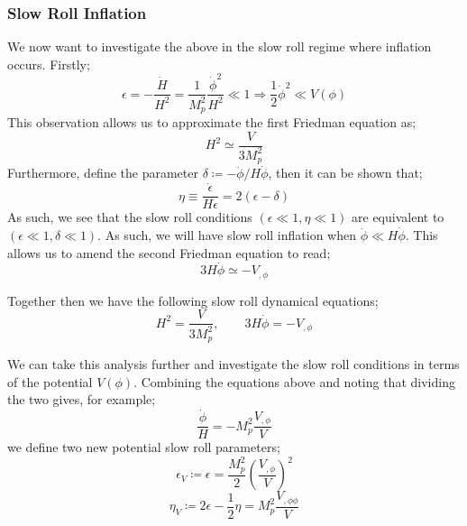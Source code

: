\subsubsection{Slow Roll Inflation}
We now want to investigate the above in the slow roll regime where inflation occurs. Firstly;
\begin{equation*}
\epsilon = -\frac{\dot{H}}{H^2} = \frac{1}{M_p^2}\frac{\dot{\phi}^2}{H^2} \ll 1 \Rightarrow \frac{1}{2}\dot{\phi}^2 \ll V(\phi)
\end{equation*}
This observation allows us to approximate the first Friedman equation as;
\begin{equation*}
H^2 \simeq \frac{V}{3M_p^2}
\end{equation*}
Furthermore, define the parameter $\delta \coloneqq -\ddot{\phi}/H\dot{\phi}$, then it can be shown that;
\begin{equation}
\eta \equiv \frac{\dot{\epsilon}}{H\epsilon} = 2(\epsilon - \delta)
\end{equation}
As such, we see that the slow roll conditions $(\epsilon \ll 1, \eta \ll 1)$ are equivalent to $(\epsilon \ll 1, \delta \ll 1)$. As such, we will have slow roll inflation when $\ddot{\phi} \ll H \dot{\phi}$. This allows us to amend the second Friedman equation to read;
\begin{equation*}
3H \dot{\phi} \simeq -V_{, \phi}
\end{equation*}
\begin{definitionbox}
Together then we have the following slow roll dynamical equations;
\begin{equation}
H^2 = \frac{V}{3M_p^2}, \qquad 3H \dot{\phi} = -V_{, \phi}
\end{equation}
\end{definitionbox}
We can take this analysis further and investigate the slow roll conditions in terms of the potential $V(\phi)$. Combining the equations above and noting that dividing the two gives, for example;
\begin{equation*}
\frac{\dot{\phi}}{H} = -M_p^2 \frac{V_{, \phi}}{V}
\end{equation*}
we define two new potential slow roll parameters;
\begin{equation}
\epsilon_V \coloneqq \epsilon = \frac{M_p^2}{2}\left(\frac{V_{, \phi}}{V}\right)^2
\end{equation}
\begin{equation}
\eta_V \coloneqq 2\epsilon - \frac{1}{2}\eta = M_p^2 \frac{V_{, \phi\phi}}{V}
\end{equation}
